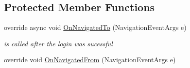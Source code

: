 \subsection*{Protected Member Functions}
\begin{DoxyCompactItemize}
\item 
override async void \hyperlink{class_listen_to_me_1_1_main_page_a8027d1a18b781cfe127ca02916c4552e}{On\+Navigated\+To} (Navigation\+Event\+Args e)
\begin{DoxyCompactList}\small\item\em is called after the login was sucessful \end{DoxyCompactList}\item 
override void \hyperlink{class_listen_to_me_1_1_main_page_a15a008ef01c6354ef72d4ec864d8d8e3}{On\+Navigated\+From} (Navigation\+Event\+Args e)
\end{DoxyCompactItemize}
